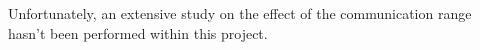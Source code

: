 Unfortunately, an extensive study on the effect of the communication range hasn't been 
performed within this project.








